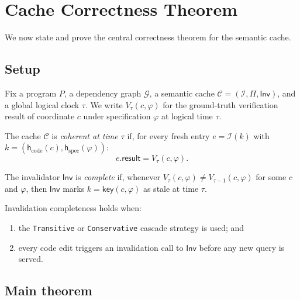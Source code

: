 \documentclass[11pt]{article}
\newcommand{\Cache}{\mathcal{C}}                   %
\newcommand{\CacheKey}{\mathsf{key}}               %
\newcommand{\CodeHash}{\mathsf{h}_{\mathrm{code}}} %
\newcommand{\SpecHash}{\mathsf{h}_{\mathrm{spec}}} %
\newcommand{\CacheIndex}{\mathcal{I}}              %
\newcommand{\CachePol}{\Pi}                        %
\newcommand{\CacheInval}{\mathsf{Inv}}             %
\newcommand{\DepGraph}{\mathcal{G}}                %
\begin{document}
\section{Cache Correctness Theorem}\label{sec:correctness}

We now state and prove the central correctness theorem for the semantic
cache.

\subsection{Setup}

Fix a program $P$, a dependency graph $\DepGraph$, a semantic cache
$\Cache = (\CacheIndex, \CachePol, \CacheInval)$, and a global logical
clock $\tau$.  We write $V_\tau(c, \varphi)$ for the ground-truth
verification result of coordinate $c$ under specification $\varphi$ at
logical time $\tau$.

\begin{definition}\label{def:coherence}
The cache $\Cache$ is \emph{coherent at time $\tau$} if, for every
fresh entry $e = \CacheIndex(k)$ with $k = (\CodeHash(c), \SpecHash(\varphi))$:
\[
  e.\mathsf{result} = V_\tau(c, \varphi).
\]
\end{definition}

\begin{definition}\label{def:inval-complete}
The invalidator $\CacheInval$ is \emph{complete} if, whenever
$V_\tau(c, \varphi) \ne V_{\tau-1}(c, \varphi)$ for some $c$ and
$\varphi$, then $\CacheInval$ marks $k = \CacheKey(c, \varphi)$
as stale at time $\tau$.
\end{definition}

Invalidation completeness holds when:
\begin{enumerate}[label=(\roman*)]
\item the \texttt{Transitive} or \texttt{Conservative} cascade strategy
  is used; and
\item every code edit triggers an invalidation call to $\CacheInval$
  before any new query is served.
\end{enumerate}

\subsection{Main theorem}
\end{document}
